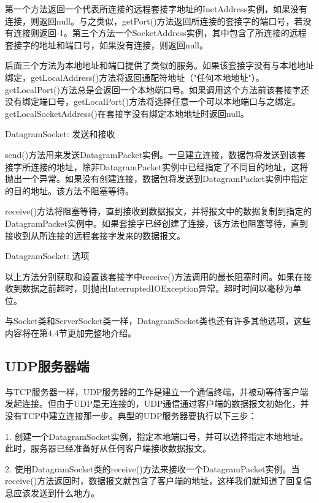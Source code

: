 		第一个方法返回一个代表所连接的远程套接字地址的InetAddress实例，如果没有连接，则返回null。与之类似，getPort()方法返回所连接的套接字的端口号，若没有连接则返回-1。第三个方法一个SocketAddress实例，其中包含了所连接的远程套接字的地址和端口号，如果没有连接，则返回null。 

		后面三个方法为本地地址和端口提供了类似的服务。如果该套接字没有与本地地址绑定，getLocalAddress()方法将返回通配符地址（"任何本地地址"）。getLocalPort()方法总是会返回一个本地端口号。如果调用这个方法前该套接字还没有绑定端口号，getLocalPort()方法将选择任意一个可以本地端口与之绑定。getLocalSocketAddress()在套接字没有绑定本地地址时返回null。 

		DatagramSocket: 发送和接收 

		
		 
		send()方法用来发送DatagramPacket实例。一旦建立连接，数据包将发送到该套接字所连接的地址，除非DatagramPacket实例中已经指定了不同目的地址，这将抛出一个异常。如果没有创建连接，数据包将发送到DatagramPacket实例中指定的目的地址。该方法不阻塞等待。 

		receive()方法将阻塞等待，直到接收到数据报文，并将报文中的数据复制到指定的DatagramPacket实例中。如果套接字已经创建了连接，该方法也阻塞等待，直到接收到从所连接的远程套接字发来的数据报文。 

		DatagramSocket: 选项 

		

		以上方法分别获取和设置该套接字中receive()方法调用的最长阻塞时间。如果在接收到数据之前超时，则抛出InterruptedIOException异常。超时时间以毫秒为单位。 

		与Socket类和ServerSocket类一样，DatagramSocket类也还有许多其他选项，这些内容将在第4.4节更加完整地介绍。 

 
	\subsection{UDP服务器端}

		与TCP服务器一样，UDP服务器的工作是建立一个通信终端，并被动等待客户端发起连接。但由于UDP是无连接的，UDP通信通过客户端的数据报文初始化，并没有TCP中建立连接那一步。典型的UDP服务器要执行以下三步： 

		1. 创建一个DatagramSocket实例，指定本地端口号，并可以选择指定本地地址。此时，服务器已经准备好从任何客户端接收数据报文。 

		2. 使用DatagramSocket类的receive()方法来接收一个DatagramPacket实例。当receive()方法返回时，数据报文就包含了客户端的地址，这样我们就知道了回复信息应该发送到什么地方。 

